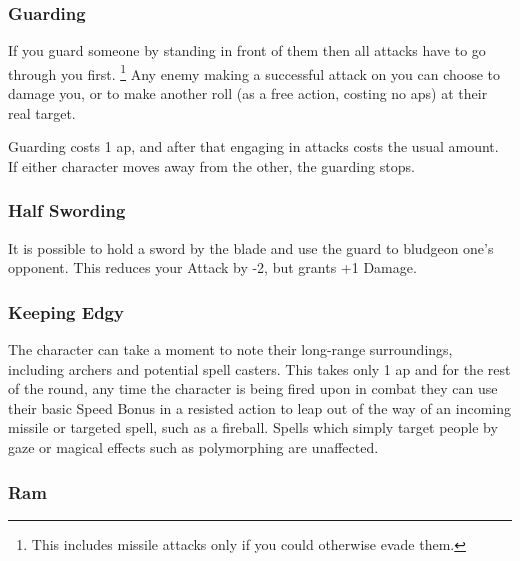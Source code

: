 \begin{multicols}{2}
\subsubsection[Guard: Someone must successfully hit you before they are allowed to hit whomever you are guarding. Cost: 1 \gls{ap}]{Guarding}

If you guard someone by standing in front of them then all attacks have to go through you first.%
\footnote{This includes missile attacks only if you could otherwise evade them.}
Any enemy making a successful attack on you can choose to damage you, or to make another roll (as a free action, costing no \glspl{ap}) at their real target.

Guarding costs 1 \gls{ap}, and after that engaging in attacks costs the usual amount.
If either character moves away from the other, the guarding stops.

\subsubsection[Half Swording: Swords can take a -2 penalty to Attack in return for +1 Damage. Cost: 1 \gls{ap}]{Half Swording}

It is possible to hold a sword by the blade and use the guard to bludgeon one's opponent.
This reduces your Attack by -2, but grants +1 Damage.

\subsubsection[Keep Edgy: Look out for missiles (allows you to defend against them with Speed Bonus). Cost: 1 \gls{ap}]{Keeping Edgy}
\label{edgy}

The character can take a moment to note their long-range surroundings, including archers and potential spell casters.
This takes only 1 \gls{ap} and for the rest of the round, any time the character is being fired upon in combat they can use their basic Speed Bonus in a resisted action to leap out of the way of an incoming missile or targeted spell, such as a fireball.
Spells which simply target people by gaze or magical effects such as polymorphing are unaffected.

\subsubsection[Ram: Push the enemy back 2 squares plus the difference between your Strength Bonuses. Resisting costs 2 \glspl{ap}, and requires a resisted Strength + Combat roll. Cost: 2 \glspl{ap}]{Ram}
\label{ram}


\end{multicols}
